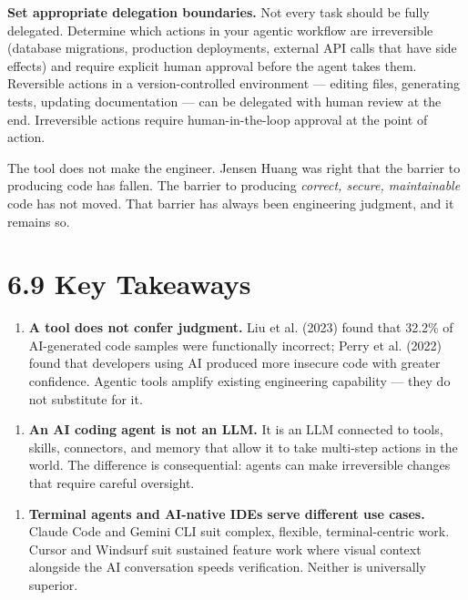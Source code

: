 \documentclass[11pt,a4paper]{book}
\begin{document}
\textbf{Set appropriate delegation boundaries.} Not every task should be fully delegated. Determine which actions in your agentic workflow are irreversible (database migrations, production deployments, external API calls that have side effects) and require explicit human approval before the agent takes them. Reversible actions in a version-controlled environment --- editing files, generating tests, updating documentation --- can be delegated with human review at the end. Irreversible actions require human-in-the-loop approval at the point of action.

The tool does not make the engineer. Jensen Huang was right that the barrier to producing code has fallen. The barrier to producing \textit{correct, secure, maintainable} code has not moved. That barrier has always been engineering judgment, and it remains so.

\medskip

\section{6.9 Key Takeaways}

\begin{enumerate}
  \item \textbf{A tool does not confer judgment.} Liu et al. (2023) found that 32.2\% of AI-generated code samples were functionally incorrect; Perry et al. (2022) found that developers using AI produced more insecure code with greater confidence. Agentic tools amplify existing engineering capability --- they do not substitute for it.
\end{enumerate}

\begin{enumerate}
  \item \textbf{An AI coding agent is not an LLM.} It is an LLM connected to tools, skills, connectors, and memory that allow it to take multi-step actions in the world. The difference is consequential: agents can make irreversible changes that require careful oversight.
\end{enumerate}

\begin{enumerate}
  \item \textbf{Terminal agents and AI-native IDEs serve different use cases.} Claude Code and Gemini CLI suit complex, flexible, terminal-centric work. Cursor and Windsurf suit sustained feature work where visual context alongside the AI conversation speeds verification. Neither is universally superior.
\end{enumerate}
\end{document}
